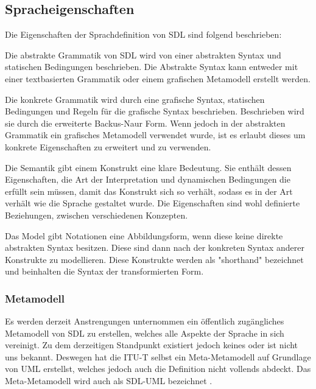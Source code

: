 \subsection{Spracheigenschaften}
\label{ssc:Spracheigenschaften}
Die Eigenschaften der Sprachdefinition von \ac{SDL} sind folgend beschrieben\cite[2\psq]{ITUT111_2016}:
\begin{itemize}{
		\item[Abstrakte Grammatik] Die abstrakte Grammatik von \ac{SDL} wird von einer abstrakten Syntax und statischen Bedingungen 
		beschrieben. Die Abstrakte Syntax kann entweder mit einer textbasierten Grammatik oder einem grafischen Metamodell erstellt werden.
		
		\item[Konkrete Grammatik] Die konkrete Grammatik wird durch eine grafische Syntax, statischen Bedingungen und Regeln für die grafische Syntax beschrieben.
		Beschrieben wird sie durch die erweiterte Backus-Naur Form. Wenn jedoch in der abstrakten Grammatik ein 
		grafisches Metamodell verwendet wurde, ist es erlaubt dieses um konkrete Eigenschaften zu erweitert und zu verwenden.
		
		\item[Semantik] Die Semantik gibt einem Konstrukt eine klare Bedeutung. Sie enthält dessen Eigenschaften, die Art der Interpretation und dynamischen Bedingungen die erfüllt sein müssen, damit das Konstrukt sich so verhält, sodass es in der Art verhält wie die Sprache gestaltet wurde. Die Eigenschaften sind wohl definierte Beziehungen, zwischen verschiedenen Konzepten.
		
		\item[Model] Das Model gibt Notationen eine Abbildungsform, wenn diese keine direkte abstrakten Syntax besitzen. Diese sind dann nach der konkreten Syntax anderer Konstrukte zu modellieren. Diese Konstrukte werden als "shorthand" bezeichnet und  beinhalten die Syntax der transformierten Form.
}\end{itemize}

\subsubsection{Metamodell}
\label{ssc:Metamodell}
Es werden derzeit Anstrengungen unternommen ein öffentlich zugängliches Metamodell von \ac{SDL} zu erstellen, welches alle Aspekte der Sprache in sich vereinigt. Zu dem derzeitigen Standpunkt existiert jedoch keines oder ist nicht uns bekannt. Deswegen hat die \ac{ITU-T} selbst ein Meta-Metamodell auf Grundlage von 
\ac{UML} erstellst, welches jedoch auch die Definition nicht vollends abdeckt. Das Meta-Metamodell wird auch als SDL-UML bezeichnet \cite[18]{ITUT109_2016}.
